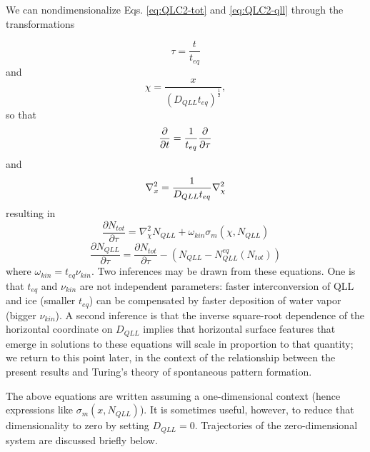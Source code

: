 \documentclass[draft]{agujournal2019}
\begin{document}
We can nondimensionalize Eqs. \ref{eq:QLC2-tot} and \ref{eq:QLC2-qll} through the transformations

\begin{equation}
    \tau = \frac{t}{t_{eq}} 
    \label{eq:tau and teq}
\end{equation}
and 
\begin{equation}
    \chi = \frac x {(D_{QLL}t_{eq})^{\frac 1 2} },
    \label{eq:chi and D and teq}
\end{equation}
so that
\begin{equation}
    \frac{\partial}{\partial t} = {1 \over t_{eq}} \frac{\partial}{\partial \tau} 
    \label{eq:dtau dt}
\end{equation}
and
\begin{equation}
\nabla_x^2 = {1 \over D_{QLL}t_{eq}} \nabla_\chi^2
\end{equation}
resulting in
\begin{equation}
    \frac{\partial N_{tot}}{\partial \tau} = \nabla_\chi^2 N_{QLL} + \omega_{kin}\sigma_m(\chi,N_{QLL})
    \label{eq:QLC2-tot-ND}
\end{equation}
\begin{equation}
    \frac{\partial N_{QLL}}{\partial \tau} = \frac{\partial N_{tot}}{\partial \tau} - \left(N_{QLL} - N_{QLL}^{eq}(N_{tot})\right)
    \label{eq:QLC2-QLL-ND}
\end{equation}
where $\omega_{kin} = t_{eq}\nu_{kin}$. Two inferences may be drawn from these equations. One is that $t_{eq}$ and $\nu_{kin}$ are not independent parameters: faster interconversion of QLL and ice (smaller $t_{eq}$) can be compensated by faster deposition of water vapor (bigger $\nu_{kin}$). A second inference is that the inverse square-root dependence of the horizontal coordinate on $D_{QLL}$ implies that horizontal surface features that emerge in solutions to these equations will scale in proportion to that quantity; we return to this point later, in the context of the relationship between the present results and Turing's theory of spontaneous pattern formation.

The above equations are written assuming a one-dimensional context (hence expressions like $\sigma_m(x,N_{QLL})$). It is sometimes useful, however, to reduce that dimensionality to zero by setting $D_{QLL}=0$. Trajectories of the zero-dimensional system are discussed briefly below.
\end{document}
